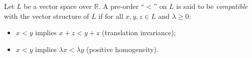 Let $L$ be a vector space over $\mathbb{R}$. A pre-order ``$<$'' on $L$ is said to be \emph{compatible} with the vector structure of $L$ if for all $x, y, z \in L$ and $\lambda \geq 0$:
\begin{itemize}
\item $x < y$ implies $x + z < y + z$ (translation invariance);
\item $x < y$ implies $\lambda x < \lambda y$ (positive homogeneity).
\end{itemize}
